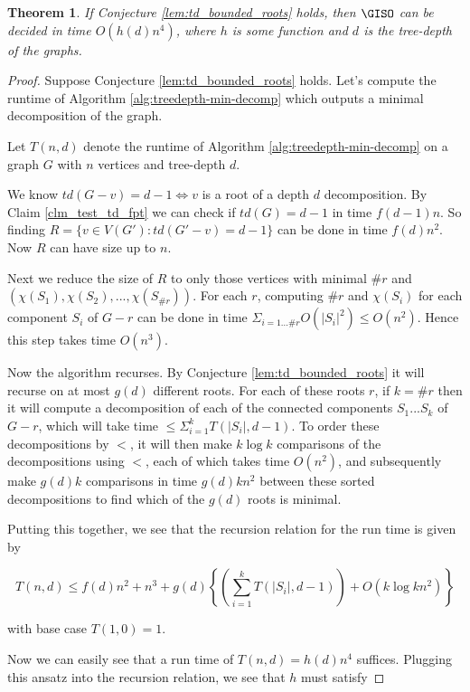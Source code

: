 \documentclass[11pt]{report}
\newtheorem{thm}{Theorem}
\begin{document}
\begin{thm} If Conjecture \ref{lem:td_bounded_roots} holds, then $\GISO$ can be decided in time $O(h(d)n^4)$, where $h$ is some function and $d$ is the tree-depth of the graphs.
\end{thm}
\begin{proof}

Suppose Conjecture \ref{lem:td_bounded_roots} holds. Let's compute the runtime of Algorithm \ref{alg:treedepth-min-decomp} which outputs a minimal decomposition of the graph. 

Let $T(n,d)$ denote the runtime of Algorithm \ref{alg:treedepth-min-decomp} on a graph $G$ with $n$ vertices and tree-depth $d$.

We know $td(G-v)=d-1 \Leftrightarrow v$ is a root of a depth $d$ decomposition. By Claim \ref{clm_test_td_fpt} we can check if $td(G)=d-1$ in time $f(d-1)n$. So finding $R=\{v\in V(G'): td(G'-v)= d-1\}$ can be done in time $f(d)n^2$. Now $R$  can have size up to $n$. 

Next we reduce the size of $R$ to only those vertices with minimal $\# r$ and $(\chi(S_1), \chi(S_2), ...,\chi (S_{\# r}))$.  For each $r$, computing $\# r$ and $\chi(S_i)$ for each component $S_i$ of $G-r$ can be done in time $\displaystyle \Sigma_{i=1...\# r} O(|S_i|^2)  \leq O(n^2)$.  Hence this step takes time $O(n^3)$.

Now the algorithm recurses. By Conjecture \ref{lem:td_bounded_roots} it will recurse on at most $g(d)$ different roots. For each of these roots $r$, if $k=\# r$ then it will compute a decomposition of each of the connected components $S_1...S_k$ of $G-r$, which will take time $\leq \displaystyle \Sigma_{i=1}^{k} T(|S_i|, d-1)$. To order these decompositions by $<$, it will then make $k\log k$ comparisons of the decompositions using $<$, each of which takes time $O(n^2)$, and subsequently make $g(d)k$ comparisons in time $g(d )k n^2$  between these sorted decompositions to find which of the $g(d)$ roots is minimal.

Putting this together, we see that the recursion relation for the run time is given by

\[T(n,d) \leq f(d)n^2 + n^3 + g(d)\left\{ \left( \displaystyle \sum_{i=1}^{k} T(|S_i|, d-1)\right) +  O(k\log k n^2) \right\}\]

with base case $T(1,0)=1$.

Now we can easily see that a run time of $T(n,d)=h(d)n^4$ suffices. Plugging this ansatz into the recursion relation, we see that $h$ must satisfy


\end{proof}
\end{document}
